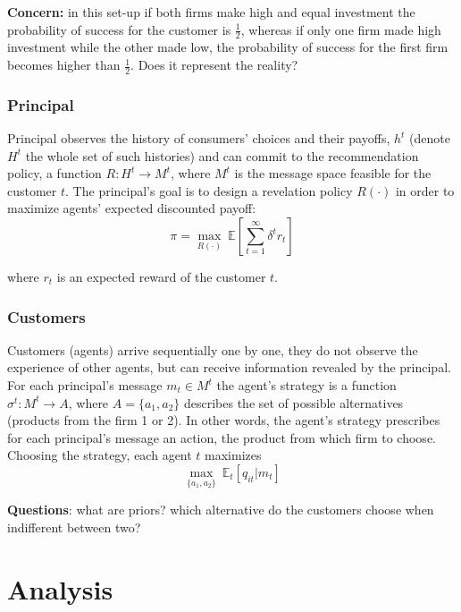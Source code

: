 \documentclass[a4paper]{article}
\newcommand{\expect}{\mathbb{E}}
\begin{document}
	
	
	
	
	\textbf{Concern:} in this set-up if both firms make high and equal investment the probability of success for the customer is $\frac{1}{2}$, whereas if only one firm made high investment while the other made low, the probability of success for the first firm becomes higher than $\frac{1}{2}$. Does it represent the reality?
	


	\subsubsection{Principal}
	Principal observes the history of consumers' choices and their payoffs, $h^t$ (denote $H^t$ the whole set of such histories) and can commit to the recommendation policy, a function $R: H^t \to M^t$, where $M^t$ is the message space feasible for the customer $t$. The principal's goal is to design a revelation policy $R(\cdot)$ in order to maximize agents' expected discounted payoff:
	$$\pi = \underset{R(\cdot)}{\max}\ \expect\left[\sum_{t=1}^{\infty} \delta^t r_{t} \right]$$
	
	where $r_t$ is an expected reward of the customer $t$.
	
	
	
	
	
	\subsubsection{Customers}
	
	Customers (agents) arrive sequentially one by one, they do not observe the experience of other agents, but can receive information revealed by the principal. For each principal's message $m_t \in M^t$ the agent's strategy is a function $\sigma^t: M^t \to A$, where $A = \{a_1, a_2\}$ describes the set of possible alternatives (products from the firm 1 or 2). In other words, the agent's strategy prescribes for each principal's message an action, the product from which firm to choose. Choosing the strategy, each agent $t$ maximizes
	$$\underset{\{a_1, a_2\}}{\max}\ \expect_t \left[q_{it}|m_t \right]$$
	
	
	
	
	\textbf{Questions}: what are priors? which alternative do the customers choose when indifferent between two?
	

\section{Analysis}
\end{document}
